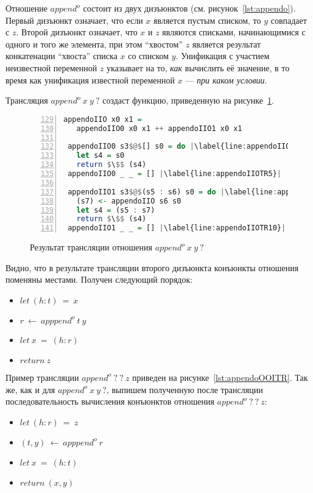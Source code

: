 Отношение $append^o$ состоит из двух дизъюнктов (см. рисунок~\ref{lst:appendo}).
Первый дизъюнкт означает, что если $x$ является пустым списком, то $y$ совпадает с $z$.
Второй дизъюнкт означает, что $x$ и $z$ являются списками, начинающимися с одного и того же элемента, при этом ``хвостом'' $z$ является результат конкатенации ``хвоста'' списка $x$ со списком $y$.
Унификация с участием неизвестной переменной $z$ указывает на то, \emph{как} вычислить её значение, в то время как унификация известной переменной $x$ --- \emph{при каком условии}.

Трансляция $append^o \ x \ y \ ?$ создаст функцию, приведенную на рисунке~\ref{lst:appendoIIOTR}.

\begin{figure}[h!]
  \begin{center}
  \begin{minipage}{0.85\textwidth}
  \begin{lstlisting}[language=Haskell, frame=single, numbers=left,numberstyle=\small, firstnumber=129, escapechar=|]
 appendoIIO x0 x1 =
   appendoIIO0 x0 x1 ++ appendoIIO1 x0 x1

 appendoIIO0 s3$@$[] s0 = do |\label{line:appendoIIOTR2}|
   let s4 = s0
   return $\$$ (s4)
 appendoIIO0 _ _ = [] |\label{line:appendoIIOTR5}|

 appendoIIO1 s3$@$(s5 : s6) s0 = do |\label{line:appendoIIOTR6}|
   (s7) <- appendoIIO s6 s0
   let s4 = (s5 : s7)
   return $\$$ (s4)
 appendoIIO1 _ _ = [] |\label{line:appendoIIOTR10}|
   \end{lstlisting}
   \end{minipage}
   \end{center}
   \caption{Результат трансляции отношения $append^o \ x \ y \ ?$}
   \label{lst:appendoIIOTR}
\end{figure}

Видно, что в результате трансляции второго дизъюнкта конъюнкты отношения поменяны местами.
Получен следующий порядок:
\begin{itemize}
    \item $let~(h:t)~=~x$
    \item $r~\gets~apppend^o~t~y$
    \item $let~x~=~(h:r)$
    \item $return~z$
\end{itemize}

Пример трансляции $append^o \ ? \ ? \ z$ приведен на рисунке~\ref{lst:appendoOOITR}.
Так же, как и для $append^o \ x \ y \ ?$, выпишем полученную после трансляции последовательность вычисления конъюнктов отношения $append^o \ ? \ ? \ z$:
\begin{itemize}
    \item $let~(h:r)~=~z$
    \item $(t,y)~\gets~apppend^o~r$
    \item $let~x~=~(h:t)$
    \item $return~(x,y)$
\end{itemize}

